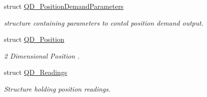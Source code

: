 \begin{DoxyCompactItemize}
struct \hyperlink{struct_q_d___position_demand_parameters}{Q\+D\+\_\+\+Position\+Demand\+Parameters}
\begin{DoxyCompactList}\small\item\em structure containing parameters to contol position demand output. \end{DoxyCompactList}\item 
struct \hyperlink{struct_q_d___position}{Q\+D\+\_\+\+Position}
\begin{DoxyCompactList}\small\item\em 2 Dimensional Position . \end{DoxyCompactList}\item 
struct \hyperlink{struct_q_d___readings}{Q\+D\+\_\+\+Readings}
\begin{DoxyCompactList}\small\item\em Structure holding position readings. \end{DoxyCompactList}\end{DoxyCompactItemize}
